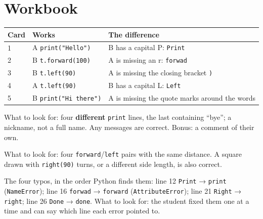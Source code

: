 
\section{Workbook}
\begin{answer}
\begin{tabularx}{\linewidth}{@{}l>{\raggedright\arraybackslash}p{4.6cm}>{\raggedright\arraybackslash}X@{}}
\toprule
Card & Works & The difference\\
\midrule
1 & A \texttt{print("Hello")} & B has a capital P: \texttt{Print}\\
2 & B \texttt{t.forward(100)} & A is missing an r: \texttt{forwad}\\
3 & B \texttt{t.left(90)} & A is missing the closing bracket \texttt{)}\\
4 & A \texttt{t.left(90)} & B has a capital L: \texttt{Left}\\
5 & B \texttt{print("Hi there")} & A is missing the quote marks around the words\\
\bottomrule
\end{tabularx}
\end{answer}

\begin{answer}
What to look for: four \textbf{different} \texttt{print} lines, the last containing \enquote{bye}; a nickname, not a full name. Any messages are correct. Bonus: a comment of their own.
\end{answer}

\begin{answer}
What to look for: four \texttt{forward}/\texttt{left} pairs with the same distance. A square drawn with \texttt{right(90)} turns, or a different side length, is also correct.
\end{answer}

\begin{answer}
The four typos, in the order Python finds them: line 12 \texttt{Print} → \texttt{print} (\texttt{NameError}); line 16 \texttt{forwad} → \texttt{forward} (\texttt{AttributeError}); line 21 \texttt{Right} → \texttt{right}; line 26 \texttt{Done} → \texttt{done}. What to look for: the student fixed them one at a time and can say which line each error pointed to.
\end{answer}

